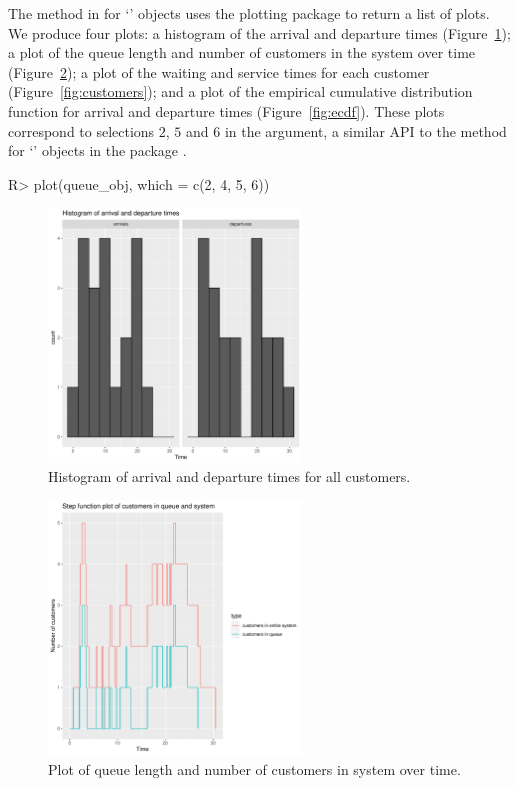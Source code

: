 \documentclass[article]{jss}
\begin{document}
%
The  method in  for `'
objects uses the plotting package  \citep{Rpkg_ggplot2}
to return a list of plots. We produce four plots: a histogram of the
arrival and departure times (Figure~\ref{fig:histogram}); a plot of
the queue length and number of customers in the system over time
(Figure~\ref{fig:qlength}); a plot of the waiting and service times
for each customer (Figure~\ref{fig:customers}); and a plot of the
empirical cumulative distribution function for arrival and departure
times (Figure~\ref{fig:ecdf}). These plots correspond to selections
$2$, $5$ and
$6$ in the  argument, a similar API to the 
method for `' objects in the  package
\citep{Rproglang}.
%
\begin{CodeChunk}
\begin{Sinput}
R> plot(queue_obj, which = c(2, 4, 5, 6))
\end{Sinput}
\end{CodeChunk}
%
\begin{figure}[t!]
\centering
\includegraphics[width = 0.6\textwidth, trim = 0 5 0 5, clip]{hist_083.pdf}
\caption{Histogram of arrival and departure times for all customers.}
\label{fig:histogram}
\end{figure}

\begin{figure}[t!]
\centering
\includegraphics[width = 0.6\textwidth, trim = 0 5 0 5, clip]{qlength_083.pdf}
\caption{Plot of queue length and number of customers in system over time.}
\label{fig:qlength}
\end{figure}
\end{document}
